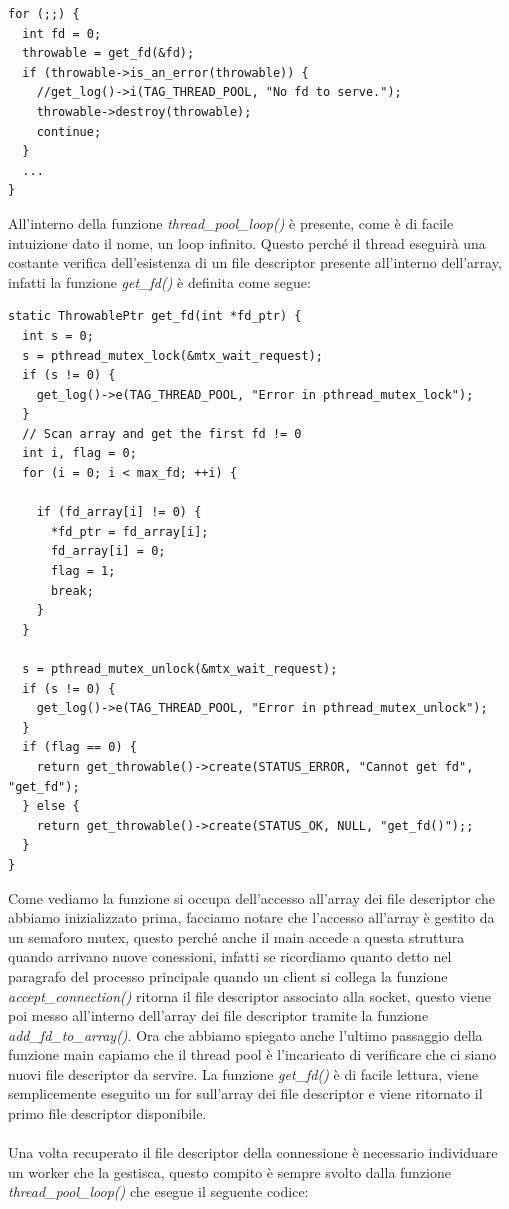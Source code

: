 \documentclass[italian]{tktltiki2}
\begin{document}
\begin{lstlisting}
for (;;) {
  int fd = 0;
  throwable = get_fd(&fd);
  if (throwable->is_an_error(throwable)) {
    //get_log()->i(TAG_THREAD_POOL, "No fd to serve.");
    throwable->destroy(throwable);
    continue;
  }
  ...
}
\end{lstlisting}
All'interno della funzione \emph{thread\_pool\_loop()} è presente, come è di facile intuizione dato il nome, un loop infinito. Questo perché il thread eseguirà una costante verifica dell'esistenza di un file descriptor presente all'interno dell'array, infatti la funzione \emph{get\_fd()} è definita come segue:
\begin{lstlisting}
static ThrowablePtr get_fd(int *fd_ptr) {
  int s = 0;
  s = pthread_mutex_lock(&mtx_wait_request);
  if (s != 0) {
    get_log()->e(TAG_THREAD_POOL, "Error in pthread_mutex_lock");
  }
  // Scan array and get the first fd != 0
  int i, flag = 0;
  for (i = 0; i < max_fd; ++i) {

    if (fd_array[i] != 0) {
      *fd_ptr = fd_array[i];
      fd_array[i] = 0;
      flag = 1;
      break;
    }
  }

  s = pthread_mutex_unlock(&mtx_wait_request); 
  if (s != 0) {
    get_log()->e(TAG_THREAD_POOL, "Error in pthread_mutex_unlock");
  }
  if (flag == 0) {
    return get_throwable()->create(STATUS_ERROR, "Cannot get fd", "get_fd");
  } else {
    return get_throwable()->create(STATUS_OK, NULL, "get_fd()");;
  }
}
\end{lstlisting}
Come vediamo la funzione si occupa dell'accesso all'array dei file descriptor che abbiamo inizializzato prima, facciamo notare che l'accesso all'array è gestito da un semaforo mutex, questo perché anche il main accede a questa struttura quando arrivano nuove conessioni, infatti se ricordiamo quanto detto nel paragrafo del processo principale quando un client si collega la funzione \emph{accept\_connection()} ritorna il file descriptor associato alla socket, questo viene poi messo all'interno dell'array dei file descriptor tramite la funzione \emph{add\_fd\_to\_array()}. Ora che abbiamo spiegato anche l'ultimo passaggio della funzione main capiamo che il thread pool è l'incaricato di verificare che ci siano nuovi file descriptor da servire. La funzione \emph{get\_fd()} è di facile lettura, viene semplicemente eseguito un for sull'array dei file descriptor e viene ritornato il primo file descriptor disponibile.
\\
\\
Una volta recuperato il file descriptor della connessione è necessario individuare un worker che la gestisca, questo compito è sempre svolto dalla funzione \emph{thread\_pool\_loop()} che esegue il seguente codice:
\end{document}
